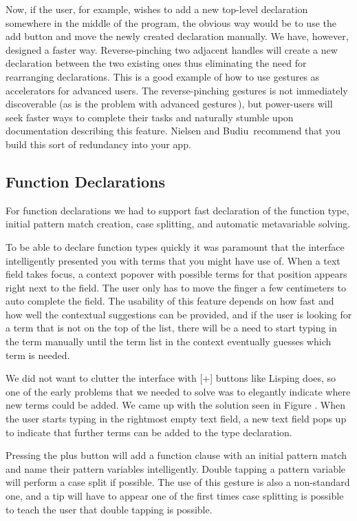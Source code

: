 Now, if the user, for example, wishes to add a new top-level declaration somewhere in the middle of the program, the obvious way would be to use the add button and move the newly created declaration manually. We have, however, designed a faster way. Reverse-pinching two adjacent handles will create a new
declaration between the two existing ones thus eliminating the  need for rearranging declarations. This is a good example of how to use gestures as accelerators for advanced users.
The reverse-pinching gestures is not immediately discoverable (as is the
problem with advanced gestures\,\cite[p 141]{nielsen2013mobile}), but power-users will seek faster
ways to complete their tasks and naturally stumble upon documentation
describing this feature. Nielsen and Budiu\,\cite[p 143]{nielsen2013mobile} recommend
that you build this sort of redundancy into your app.

\subsection{Function Declarations}
For function declarations we had to support fast declaration of the function
type, initial pattern match creation, case splitting, and automatic
metavariable solving.

To be able to declare function types quickly it was paramount that the
interface intelligently presented you with terms that you might have use of.
When a text field takes focus, a context popover with possible terms for that position
appears right next to the field. The user only has to move the finger a few
centimeters to auto complete the field. The usability of this feature depends
on how fast and how well the contextual suggestions can be provided, and if the
user is looking for a term that is not on the top of the list, there will be a
need to start typing in the term manually until the term list in the context
eventually guesses which term is needed.

We did not want to clutter the interface with [+] buttons like Lisping does, so
one of the early problems that we needed to solve was to elegantly indicate
where new terms could be added. We came up with the solution seen in Figure
. When the user starts typing in the rightmost empty text field,
a new text field pops up to indicate that further terms can be added to the
type declaration.

\missingfigure{}

Pressing the plus button will add a function clause with an initial pattern
match and name their pattern variables intelligently. Double tapping a pattern
variable will perform a case split if possible. The use of this gesture is also
a non-standard one, and a tip will have to appear one of the first times case
splitting is possible to teach the user that double tapping is possible.


